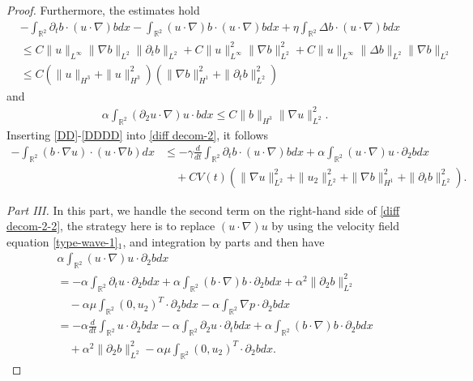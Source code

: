 \documentclass[reqno,11pt]{amsart}
\def\R{\mathbb R}
\numberwithin{Thm}{section}
\begin{document}
\begin{proof}
Furthermore, the estimates hold
\begin{align}\label{DDD}
&-\int_{\R^2}\partial_{t}b\cdot (u\cdot\nabla) bdx-\int_{\R^2}(u\cdot\nabla) b\cdot (u\cdot\nabla) bdx+\eta\int_{\R^2}\Delta b\cdot (u\cdot\nabla) bdx\nonumber\\
&\leq
C\|u\|_{L^\infty}\|\nabla b\|_{L^2}\|\partial_tb\|_{L^2}+C\|u\|_{L^\infty}^2\|\nabla b\|_{L^2}^2+C\|u\|_{L^\infty}\|\Delta b\|_{L^2}\|\nabla b\|_{L^2}\nonumber\\
&\leq C(\|u\|_{H^3}+\|u\|_{H^3}^2)\left(\|\nabla b\|_{H^1}^2+\|\partial_tb\|_{L^2}^2\right)
\end{align}
and
\begin{align}\label{DDDD}
&\alpha\int_{\R^2}(\partial_2u\cdot \nabla) u\cdot b dx
\leq C\|b\|_{H^{3}}\|\nabla u\|_{L^{2}}^2.
\end{align}
Inserting \eqref{DD}-\eqref{DDDD} into \eqref{diff decom-2}, it follows
\begin{align}\label{diff decom-2-2}
-\int_{\R^2}(b\cdot \nabla u)\cdot(u\cdot \nabla b)dx
&\leq-\gamma\frac{d}{dt}\int_{\R^2}\partial_{t}b\cdot (u\cdot\nabla) bdx+\alpha\int_{\R^2}(u\cdot \nabla) u\cdot\partial_2 bdx\nonumber\\
&\quad +CV(t)\left(\|\nabla u\|_{L^{2}}^2+\|u_2\|_{L^2}^2+\|\nabla b\|_{H^1}^2+\|\partial_tb\|_{L^{2}}^2\right).
\end{align}

{\it {Part III.}} In this part, we  handle the second term on the right-hand side of \eqref{diff decom-2-2}, the strategy here is to replace $(u\cdot \nabla) u$ by using the velocity field equation \eqref{type-wave-1}$_1$, and integration by parts and then have \begin{align*}
&\alpha\int_{\R^2}(u\cdot \nabla)u\cdot\partial_2 bdx\nonumber\\
&=-\alpha\int_{\R^2}\partial_tu\cdot\partial_2 bdx+\alpha\int_{\R^2}(b\cdot\nabla )b\cdot\partial_2 bdx+\alpha^2\|\partial_2b\|_{L^2}^2\nonumber\\
&\quad-\alpha\mu\int_{\R^2}(0,u_2)^{T}\cdot\partial_2 bdx-\alpha\int_{\R^2}\nabla p\cdot\partial_2 bdx\nonumber\\
&=-\alpha\frac{d}{dt}\int_{\R^2}u\cdot\partial_2 bdx-\alpha\int_{\R^2}\partial_2u\cdot\partial_t bdx+\alpha\int_{\R^2}(b\cdot\nabla) b\cdot\partial_2 bdx\nonumber\\
&\quad+\alpha^2\|\partial_2b\|_{L^2}^2-\alpha\mu\int_{\R^2}(0,u_2)^{T}\cdot\partial_2 bdx.
\end{align*}



\end{proof}
\end{document}
